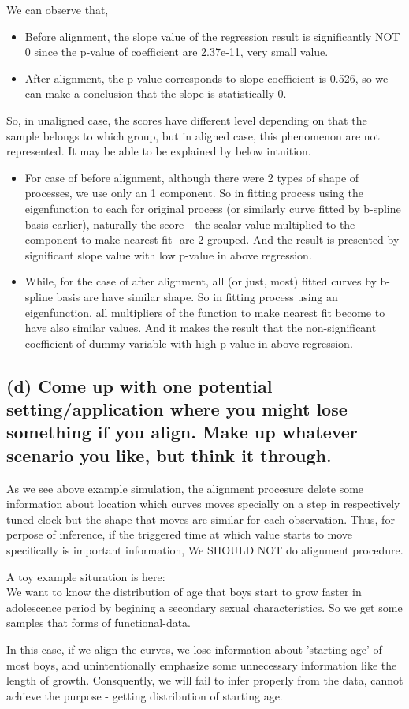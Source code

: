 \documentclass{article}
\begin{document}
We can observe that,
\begin{itemize}
    \item {Before alignment, the slope value of the regression result is significantly NOT 0 
    since the p-value of coefficient are 2.37e-11, very small value.}
    \item {After alignment, the p-value corresponds to slope coefficient is 0.526, so we can make a
    conclusion that the slope is statistically 0.
    }
\end{itemize}

So, in unaligned case, the scores have different level depending on that the sample belongs to which group,
but in aligned case, this phenomenon are not represented.
It may be able to be explained by below intuition.

\begin{itemize}
    \item{For case of before alignment, although there were 2 types of shape of processes, we use only an 1 component.
    So in fitting process using the eigenfunction to each for original process (or similarly curve fitted by b-spline basis earlier),
    naturally the score - the scalar value multiplied to the component to make nearest fit- are 2-grouped. 
    And the result is presented by significant slope value with low p-value in above regression.}
    \item{While, for the case of after alignment, all (or just, most) fitted curves by b-spline basis are 
    have similar shape. So in fitting process using an eigenfunction,
    all multipliers of the function to make nearest fit become to have also similar values.
    And it makes the result that the non-significant coefficient of dummy variable with high p-value in above regression.}
\end{itemize}



\newpage
\subsection*{(d) Come up with one potential setting/application 
where you might lose something if you align. Make up whatever scenario you like, but think it through.}

As we see above example simulation, the alignment procesure delete some information about location which
curves moves specially on a step in respectively tuned clock but the shape that moves are similar for each observation.
Thus, for perpose of inference, if the triggered time at which value starts to move specifically is important information, We SHOULD NOT do alignment procedure.


A toy example situration is here:\\
We want to know the distribution of age that boys start to grow faster in adolescence period 
by begining a secondary sexual characteristics. So we get some samples that forms of functional-data.

In this case, if we align the curves, we lose information about 'starting age' of most boys, and
unintentionally emphasize some unnecessary information like the length of growth.
Consquently, we will fail to infer properly from the data, cannot achieve the purpose - getting distribution of starting age.
\end{document}
